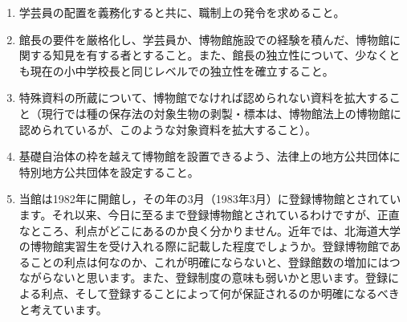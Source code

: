 \documentclass[12pt]{jsarticle}
\begin{document}
\begin{enumerate}
	\item 学芸員の配置を義務化すると共に、職制上の発令を求めること。
	\item 館長の要件を厳格化し、学芸員か、博物館施設での経験を積んだ、博物館に関する知見を有する者とすること。また、館長の独立性について、少なくとも現在の小中学校長と同じレベルでの独立性を確立すること。
	\item 特殊資料の所蔵について、博物館でなければ認められない資料を拡大すること（現行では種の保存法の対象生物の剥製・標本は、博物館法上の博物館に認められているが、このような対象資料を拡大すること）。
	\item 基礎自治体の枠を越えて博物館を設置できるよう、法律上の地方公共団体に特別地方公共団体を設定すること。
	\item 当館は1982年に開館し，その年の3月（1983年3月）に登録博物館とされています。それ以来、今日に至るまで登録博物館とされているわけですが、正直なところ、利点がどこにあるのか良く分かりません。近年では、北海道大学の博物館実習生を受け入れる際に記載した程度でしょうか。登録博物館であることの利点は何なのか、これが明確にならないと、登録館数の増加にはつながらないと思います。また、登録制度の意味も弱いかと思います。登録による利点、そして登録することによって何が保証されるのか明確になるべきと考えています。
\end{enumerate}

\end{document}
